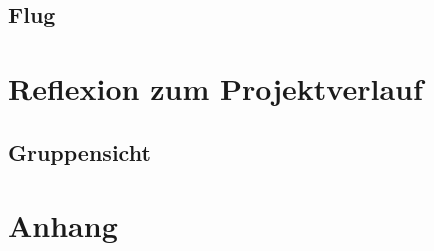 \documentclass[11pt]{article}
\begin{document}
\subsection{Flug}


\section{Reflexion zum Projektverlauf}

\subsection{Gruppensicht}
\section{Anhang}
\end{document}
